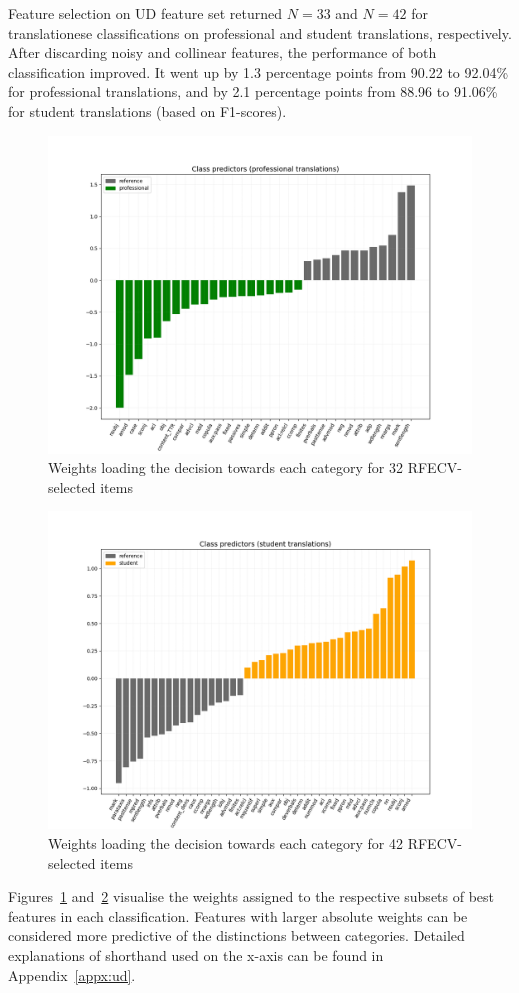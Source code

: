 Feature selection on UD feature set returned $N=33$ and $N=42$ for translationese classifications on professional and student translations, respectively. 
After discarding noisy and collinear features, the performance of both classification improved. It went up by 1.3 percentage points from 90.22 to 92.04\% for professional translations, and by 2.1 percentage points from 88.96 to 91.06\% for student translations (based on F1-scores). %
\vspace{-2em}
\begin{figure}[H]
	\centering
	\includegraphics[width=.80\linewidth]{figures/pro-ref-bars-ud33}
	\caption{\label{fig:pro-weights}Weights loading the decision towards each category for 32 RFECV-selected items}	
\end{figure}
\vspace{-2.5em}
\begin{figure}[H]
	\centering
	\includegraphics[width=.80\linewidth]{figures/stu-ref-bars-ud42}
	\caption{\label{fig:stu-weights}Weights loading the decision towards each category for 42 RFECV-selected items}	
\end{figure}
\vspace{-2.5em}
Figures~\ref{fig:pro-weights} and~\ref{fig:stu-weights} visualise the weights assigned to the respective subsets of best features in each classification. Features with larger absolute weights can be considered more predictive of the distinctions between categories. 
Detailed explanations of shorthand used on the x-axis can be found in Appendix~\ref{appx:ud}.

